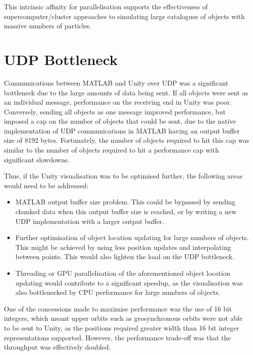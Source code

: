 \documentclass[12pt,openany,a4paper]{book}
\begin{document}
	This intrinsic affinity for parallelisation supports the effectiveness of supercomputer/cluster approaches to simulating large catalogues of objects with massive numbers of particles.
	
	\section{UDP Bottleneck}
	
	Communications between MATLAB and Unity over UDP was a significant bottleneck due to the large amounts of data being sent. If all objects were sent as an individual message, performance on the receiving end in Unity was poor. Conversely, sending all objects as one message improved performance, but imposed a cap on the number of objects that could be sent, due to the native implementation of UDP communications in MATLAB having an output buffer size of 8192 bytes. Fortunately, the number of objects required to hit this cap was similar to the number of objects required to hit a performance cap with significant slowdowns. \newline 
	
	Thus, if the Unity visualisation was to be optimised further, the following areas would need to be addressed:
	
	\begin{itemize}
		\item MATLAB output buffer size problem. This could be bypassed by sending chunked data when this output buffer size is reached, or by writing a new UDP implementation with a larger output buffer.
		\item Further optimisation of object location updating for large numbers of objects. This might be achieved by using less position updates and interpolating between points. This would also lighten the load on the UDP bottleneck.
		\item Threading or GPU parallelisation of the aforementioned object location updating would contribute to a significant speedup, as the visualisation was also bottlenecked by CPU performance for large numbers of objects.
	\end{itemize}
	
	
	One of the concessions made to maximise performance was the use of 16 bit integers, which meant upper orbits such as geosynchronous orbits were not able to be sent to Unity, as the positions required greater width than 16 bit integer representations supported. However, the performance trade-off was that the throughput was effectively doubled. \newline
	
\end{document}
